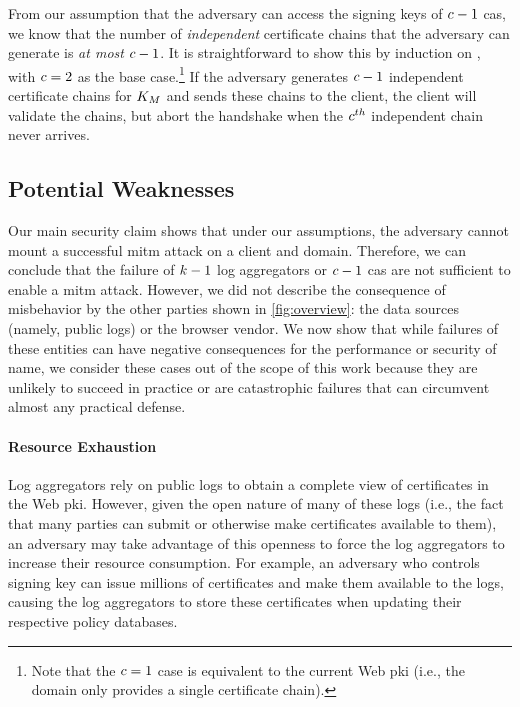 
From our assumption that the adversary can access the signing keys
of $c - 1$ \acp{ca},
we know that the number of \emph{independent} certificate chains that the adversary can generate
is \emph{at most} $c - 1$. It is straightforward to show this by induction
on \policy, with $c = 2$ as the base case.\footnote{Note that the $c
= 1$ case is equivalent to the current Web \ac{pki} (i.e., the domain only
provides a single certificate chain).} If the adversary generates $c - 1$
independent certificate chains for $K_M$ and sends these chains to
the client, the client will validate the chains, but abort the handshake when
the $c^{th}$ independent chain never arrives. 

\subsection{Potential Weaknesses}
\label{sec:analysis:weaknesses}

Our main security claim shows that under our assumptions, the adversary cannot
mount a successful \ac{mitm} attack on a client and domain. Therefore, we can
conclude that the failure of $k - 1$ log aggregators or $c - 1$ \acp{ca} 
are not sufficient to
enable a \ac{mitm} attack. However, we did not describe the consequence of
misbehavior by the other parties shown in \autoref{fig:overview}: the data
sources (namely, public logs) or the browser vendor. We now show that while
failures of these entities can have negative consequences for the performance or
security of \ac{name}, we consider these cases out of the scope of this work
because they are unlikely to succeed in practice or are catastrophic failures
that can circumvent almost any practical defense.

\paragraph{Resource Exhaustion}

Log aggregators rely on public logs to obtain a complete view of certificates in
the Web \ac{pki}. However, given the open nature of many of these logs (i.e.,
the fact that many parties can submit or otherwise make
certificates available to them), an adversary may take advantage of this
openness to force the log aggregators to increase their resource consumption.
For example, an adversary who controls  signing key can issue millions
of certificates and make them available to the logs, causing the log aggregators
to store these certificates when updating their respective policy databases.

